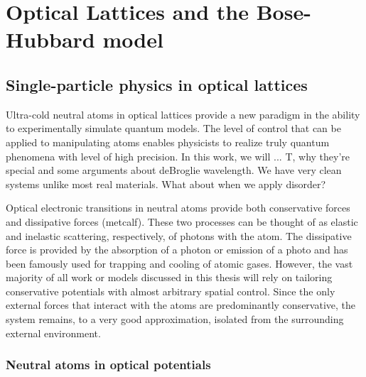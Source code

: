 

\chapter{Optical Lattices and \newline the Bose-Hubbard model}


\newpage

\section{Single-particle physics in optical lattices}

Ultra-cold neutral atoms in optical lattices provide a new paradigm in the ability to experimentally simulate quantum models. The level of control that can be applied to manipulating atoms enables physicists to realize truly quantum phenomena with level of high precision. In this work, we will ...
T, why they're special and some arguments about deBroglie wavelength. We have very clean systems unlike most real materials. What about when we apply disorder? 

Optical electronic transitions in neutral atoms provide both conservative forces and dissipative forces (metcalf). These two processes can be thought of as elastic and inelastic scattering, respectively, of photons with the atom. The dissipative force is provided by the absorption of a photon or emission of a photo and has been famously used for trapping and cooling of atomic gases. However, the vast majority of all work or models discussed in this thesis will rely on tailoring conservative potentials with almost arbitrary spatial control.  Since the only external forces that interact with the atoms are predominantly conservative, the system remains, to a very good approximation, isolated from the surrounding external environment.

\subsection{Neutral atoms in optical potentials}

